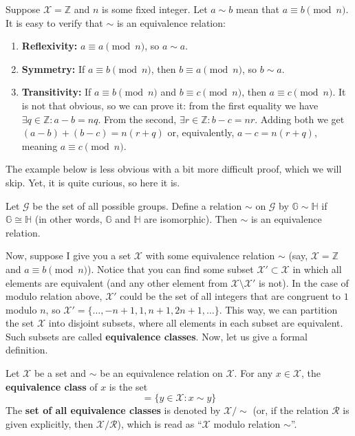 \documentclass[../lecture-notes.tex]{subfiles}
\begin{document}
\begin{example}
    Suppose $\mathcal{X} = \mathbb{Z}$ and $n$ is some fixed integer. Let $a \sim b$ mean that $a \equiv b \pmod{n}$. It is easy to verify that $\sim$ is an equivalence relation:
    \begin{enumerate}
        \item \textbf{Reflexivity:} $a \equiv a \pmod{n}$, so $a \sim a$.
        \item \textbf{Symmetry:} If $a \equiv b \pmod{n}$, then $b \equiv a \pmod{n}$, so $b \sim a$.
        \item \textbf{Transitivity:} If $a \equiv b \pmod{n}$ and $b \equiv c \pmod{n}$, then $a \equiv c \pmod{n}$. It is not that obvious, so we can prove it: from the first equality we have $\exists q \in \mathbb{Z}: a-b = nq$. From the second, $\exists r \in \mathbb{Z}: b-c = nr$. Adding both we get $(a-b)+(b-c) = n(r+q)$ or, equivalently, $a-c = n(r+q)$, meaning $a \equiv c \pmod{n}$.
    \end{enumerate}
\end{example}

The example below is less obvious with a bit more difficult proof, which we will skip. Yet, it is quite curious, so here it is.

\begin{example}
    Let $\mathcal{G}$ be the set of all possible groups. Define a relation $\sim$ on $\mathcal{G}$ by $\mathbb{G} \sim \mathbb{H}$ if $\mathbb{G} \cong \mathbb{H}$ (in other words, $\mathbb{G}$ and $\mathbb{H}$ are isomorphic). Then $\sim$ is an equivalence relation.
\end{example}

Now, suppose I give you a set $\mathcal{X}$ with some equivalence relation $\sim$ (say, $\mathcal{X} = \mathbb{Z}$ and $a \equiv b \pmod{n}$). Notice that you can find some subset $\mathcal{X}' \subset \mathcal{X}$ in which all elements are equivalent (and any other element from $\mathcal{X} \setminus \mathcal{X}'$ is not). In the case of modulo relation above, $\mathcal{X}'$ could be the set of all integers that are congruent to $1$ modulo $n$, so $\mathcal{X}' = \{\dots,-n+1,1,n+1,2n+1,\dots\}$. This way, we can partition the set $\mathcal{X}$ into disjoint subsets, where all elements in each subset are equivalent. Such subsets are called \textbf{equivalence classes}. Now, let us give a formal definition.

\begin{definition}
    Let $\mathcal{X}$ be a set and $\sim$ be an equivalence relation on $\mathcal{X}$. For any $x \in \mathcal{X}$, the \textbf{equivalence class} of $x$ is the set
    \begin{equation}
        [x] = \{y \in \mathcal{X}: x \sim y\}
    \end{equation}
    The \textbf{set of all equivalence classes} is denoted by $\mathcal{X}/\text{$\sim$}$ (or, if the relation $\mathcal{R}$ is given explicitly, then $\mathcal{X}/\mathcal{R}$), which is read as ``$\mathcal{X}$ modulo relation $\sim$''.
\end{definition}
\end{document}
